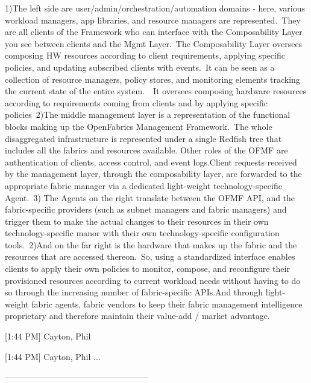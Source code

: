 1)The left side are user/admin/orchestration/automation domains - here, various workload managers, app libraries, and resource managers are represented. They are all clients of the Framework who can interface with the Composability Layer you see between clients and the Mgmt Layer. The Composability Layer oversees composing HW resources according to client requirements, applying specific policies, and updating subscribed clients with events. It can be seen as a collection of resource managers, policy stores, and monitoring elements tracking the current state of the entire system.  It oversees composing hardware resources according to requirements coming from clients and by applying specific policies 2)The middle management layer is a representation of the functional blocks making up the OpenFabrics Management Framework. The whole disaggregated infrastructure is represented under a single Redfish tree that includes all the fabrics and resources available. Other roles of the OFMF are authentication of clients, access control, and event logs.Client requests received by the management layer, through the composability layer, are forwarded to the appropriate fabric manager via a dedicated light-weight technology-specific Agent. 3) The Agents on the right translate between the OFMF API, and the fabric-specific providers (such as subnet managers and fabric managers) and trigger them to make the actual changes to their resources in their own technology-specific manor with their own technology-specific configuration tools. 2)And on the far right is the hardware that makes up the fabric and the resources that are accessed thereon. So, using a standardized interface enables clients to apply their own policies to monitor, compose, and reconfigure their provisioned resources according to current workload needs without having to do so through the increasing number of fabric-specific APIs.And through light-weight fabric agents, fabric vendors to keep their fabric management intelligence proprietary and therefore maintain their value-add / market advantage.

[1:44 PM] Cayton, Phil
  

[1:44 PM] Cayton, Phil
...


---------------------------------------------------


